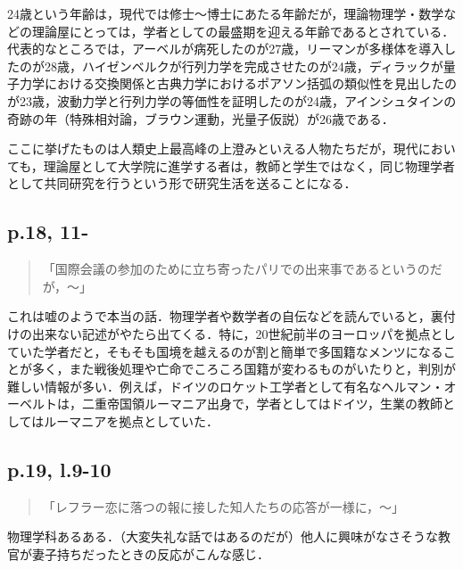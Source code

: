 \documentclass[10pt, a5paper, twoside]{jsarticle}
\theoremstyle{definition}
\begin{document}
                24歳という年齢は，現代では修士〜博士にあたる年齢だが，理論物理学・数学などの理論屋にとっては，学者としての最盛期を迎える年齢であるとされている．代表的なところでは，アーベルが病死したのが27歳，リーマンが多様体を導入したのが28歳，ハイゼンベルクが行列力学を完成させたのが24歳，ディラックが量子力学における交換関係と古典力学におけるポアソン括弧の類似性を見出したのが23歳，波動力学と行列力学の等価性を証明したのが24歳，アインシュタインの奇跡の年（特殊相対論，ブラウン運動，光量子仮説）が26歳である．

                ここに挙げたものは人類史上最高峰の上澄みといえる人物たちだが，現代においても，理論屋として大学院に進学する者は，教師と学生ではなく，同じ物理学者として共同研究を行うという形で研究生活を送ることになる．

            \subsection{p.18, 11-}

                \begin{quote}

                    「国際会議の参加のために立ち寄ったパリでの出来事であるというのだが，〜」

                \end{quote}

                これは嘘のようで本当の話．物理学者や数学者の自伝などを読んでいると，裏付けの出来ない記述がやたら出てくる．特に，20世紀前半のヨーロッパを拠点としていた学者だと，そもそも国境を越えるのが割と簡単で多国籍なメンツになることが多く，また戦後処理や亡命でころころ国籍が変わるものがいたりと，判別が難しい情報が多い．例えば，ドイツのロケット工学者として有名なヘルマン・オーベルトは，二重帝国領ルーマニア出身で，学者としてはドイツ，生業の教師としてはルーマニアを拠点としていた．

            \subsection{p.19, l.9-10}

                \begin{quote}

                    「レフラー恋に落つの報に接した知人たちの応答が一様に，〜」

                \end{quote}

                物理学科あるある．（大変失礼な話ではあるのだが）他人に興味がなさそうな教官が妻子持ちだったときの反応がこんな感じ．
\end{document}
